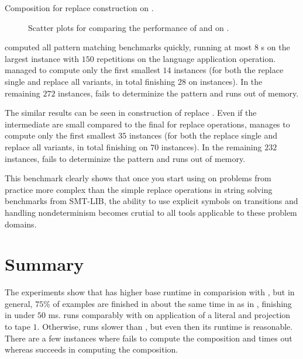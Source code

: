 \begin{table}[ht]
  \centering
  
  \caption{
    Composition for replace construction on \symbolFromEnd.
  }
  \label{tab:symbol_from_end_construct_replace}
\end{table}

\begin{figure}[ht]
    \centering
    \quad
    \caption{
      Scatter plots for comparing the performance of \mata and \mona on \symbolFromEnd.
    }
    \label{fig:symbol_from_end}%
\end{figure}

\mata computed all pattern matching benchmarks quickly, running at most $8$ s on the largest instance with $150$ repetitions on the language application operation.
\mona managed to compute only the first smallest $14$ instances (for both the replace single and replace all variants, in total finishing $28$ on instances).
In the remaining $272$ instances, \mona fails to determinize the pattern and runs out of memory.

The similar results can be seen in construction of replace \nfts. Even if the intermediate \nfts are small compared to the final \nfts for replace operations, \mona manages to compute only the first smallest $35$ instances (for both the replace single and replace all variants, in total finishing on $70$ instances).
In the remaining $232$ instances, \mona fails to determinize the pattern and runs out of memory.

This benchmark clearly shows that once you start using \nfts on problems from practice more complex than the simple replace operations in string solving benchmarks from SMT-LIB, the ability to use explicit symbols on transitions and handling nondeterminism becomes crutial to all tools applicable to these problem domains.

\section{Summary}

The experiments show that \mata has higher base runtime in comparision with \mona, but in general, $75 \%$ of examples are finished in about the same time in \mata as in \mona, finishing in under $50$ ms.
\mata runs comparably with \mona on application of a literal and projection to tape $1$.
Otherwise, \mata runs slower than \mona, but even then its runtime is reasonable.
There are a few instances where \mata fails to compute the composition and times out whereas \mona succeeds in computing the composition.

